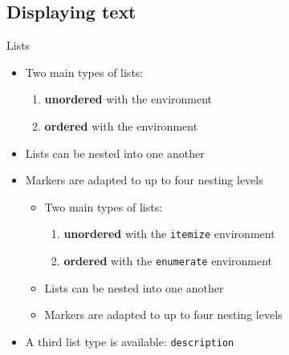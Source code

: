 \subsection{Displaying text}

\begin{frame}[fragile]{Lists}
	\begin{itemize}
		\item Two main types of lists:
		\begin{enumerate}
			\item \textbf{unordered} with the  environment
			\item \textbf{ordered} with the  environment
		\end{enumerate}
		\item Lists can be nested into one another
		\item Markers are adapted to up to four nesting levels

		\pause
\begin{codesource}
	\begin{itemize}
		\item Two main types of lists:
		\begin{enumerate}
			\item \textbf{unordered} with the \verb=itemize= environment
			\item \textbf{ordered} with the \verb=enumerate= environment
		\end{enumerate}
		\item Lists can be nested into one another
		\item Markers are adapted to up to four nesting levels
	\end{itemize}
\end{codesource}

		\pause
		\item A third list type is available: \texttt{description}
	\end{itemize}
\end{frame}

